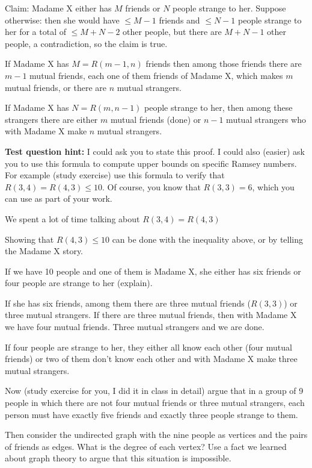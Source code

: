 \documentclass[12pt]{article}
\begin{document}
Claim:  Madame X either has $M$ friends or $N$ people strange to her.  Suppose otherwise:  then she would have
$\leq M-1$ friends and $\leq N-1$ people strange to her for a total of $\leq M+N-2$ other people, but there are $M+N-1$ other people, a contradiction, so the claim is true.

If Madame X has $M=R(m-1,n)$ friends then among those friends there are $m-1$ mutual friends, each one of them friends of Madame X, which makes $m$ mutual friends, or there are $n$ mutual strangers.

If Madame X has $N=R(m,n-1)$ people strange to her, then among these strangers there are either $m$ mutual friends
(done) or $n-1$ mutual strangers who with Madame X make $n$ mutual strangers.

{\bf Test question hint:}  I could ask you to state this proof.  I could also (easier) ask you to use this formula
to compute upper bounds on specific Ramsey numbers.  For example (study exercise) use this formula to verify that
$R(3,4) = R(4,3)\leq 10$.  Of course, you know that $R(3,3)=6$, which you can use as part of your work.

We spent a lot of time talking about $R(3,4)=R(4,3)$

Showing that $R(4,3) \leq 10$ can be done with the inequality above, or by telling the Madame X story.


If we have 10 people and one of them is Madame X, she either has six friends or four people are strange to her (explain).

If she has six friends, among them there are three mutual friends ($R(3,3)$) or three mutual strangers.
If there are three mutual friends, then with Madame X we have four mutual friends.  Three mutual strangers and we are done.

If four people are strange to her, they either all know each other (four mutual friends) or two of them don't know each other and with Madame X make three mutual strangers.

Now (study exercise for you, I did it in class in detail) argue that in a group of 9 people in which there are not four mutual friends or three mutual strangers, each person must have exactly five friends and exactly three people strange to them.

Then consider the undirected graph with the nine people as vertices and the pairs of friends as edges.  What is the degree of each vertex?  Use a fact we learned about graph theory to argue that this situation is impossible.
\end{document}

